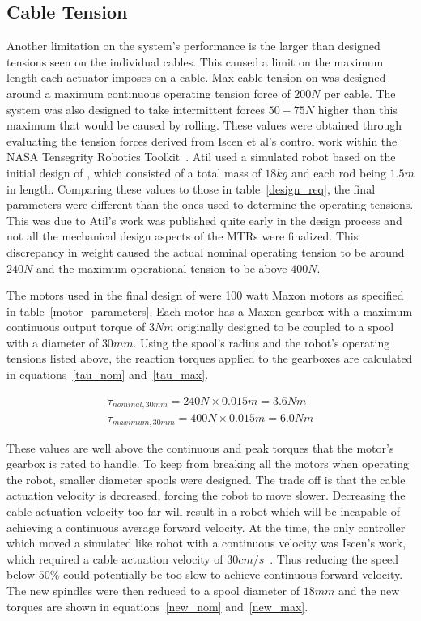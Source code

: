 \begin{appendices}
\subsection{Cable Tension}
\label{sec:cable_tension}
Another limitation on the system's performance is the larger than designed tensions seen on the individual cables.
This caused a limit on the maximum length each actuator imposes on a cable. 
Max cable tension on \SB{} was designed around a maximum continuous operating tension force of \(200N\) per cable.
The system was also designed to take intermittent forces \(50-75N\) higher than this maximum that would be caused by rolling.
These values were obtained through evaluating the tension forces derived from Iscen et al's control work within the NASA Tensegrity Robotics Toolkit~\cite{iscen2014flop}.
Atil used a simulated robot based on the initial design of \SB{}, which consisted of a total mass of \(18kg\) and each rod being \(1.5m\) in length. 
Comparing these values to those in table~\ref{design_req}, the final \SB{} parameters were different than the ones used to determine the operating tensions.
This was due to Atil's work was published quite early in the design process and not all the mechanical design aspects of the MTRs were finalized.
This discrepancy in weight caused the actual nominal operating tension to be around \(240N\) and the maximum operational tension to be above \(400N\).

The motors used in the final design of \SB{} were 100 watt Maxon motors as specified in table~\ref{motor_parameters}.
Each motor has a Maxon gearbox with a maximum continuous output torque of \(3Nm\) originally designed to be coupled to a spool with a diameter of \(30mm\).
Using the spool's radius and the robot's operating tensions listed above, the reaction torques applied to the gearboxes are calculated in equations~\ref{tau_nom} and~\ref{tau_max}.

\begin{align}
\tau_{nominal, 30mm} = 240N \times 0.015m = 3.6Nm \label{tau_nom} \\
\tau_{maximum, 30mm} = 400N \times 0.015m = 6.0Nm \label{tau_max}
\end{align}

These values are well above the continuous and peak torques that the motor's gearbox is rated to handle.
To keep from breaking all the motors when operating the robot, smaller diameter spools were designed. 
The trade off is that the cable actuation velocity is decreased, forcing the robot to move slower.
Decreasing the cable actuation velocity too far will result in a robot which will be incapable of achieving a continuous average forward velocity.
At the time, the only controller which moved a simulated \SB{} like robot with a continuous velocity was Iscen's work, which required a cable actuation velocity of \(30 cm/s\)~\cite{iscen2014flop}.
Thus reducing the speed below \(50\%\) could potentially be too slow to achieve continuous forward velocity.
The new spindles were then reduced to a spool diameter of \(18mm\) and the new torques are shown in equations~\ref{new_nom} and~\ref{new_max}.


\end{appendices}
